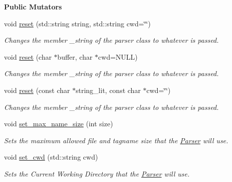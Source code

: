\begin{Indent}\textbf{ Public Mutators}\par
\begin{DoxyCompactItemize}
\item 
void \mbox{\hyperlink{class_parser_a87f5e73ca10ef5f84f37a4b37e0e6f59}{reset}} (std\+::string string, std\+::string cwd=\char`\"{}\char`\"{})
\begin{DoxyCompactList}\small\item\em Changes the member \+\_\+string of the parser class to whatever is passed. \end{DoxyCompactList}\item 
void \mbox{\hyperlink{class_parser_a5e097c301e171481e8d2af91c112e35e}{reset}} (char $\ast$buffer, char $\ast$cwd=N\+U\+LL)
\begin{DoxyCompactList}\small\item\em Changes the member \+\_\+string of the parser class to whatever is passed. \end{DoxyCompactList}\item 
void \mbox{\hyperlink{class_parser_ab51b81b1617f1948205d73804e3c0fb9}{reset}} (const char $\ast$string\+\_\+lit, const char $\ast$cwd=\char`\"{}\char`\"{})
\begin{DoxyCompactList}\small\item\em Changes the member \+\_\+string of the parser class to whatever is passed. \end{DoxyCompactList}\item 
void \mbox{\hyperlink{class_parser_ac9c3bf43a7f27f92ecf538b83c5984d6}{set\+\_\+max\+\_\+name\+\_\+size}} (int size)
\begin{DoxyCompactList}\small\item\em Sets the maximum allowed file and tagname size that the \mbox{\hyperlink{class_parser}{Parser}} will use. \end{DoxyCompactList}\item 
void \mbox{\hyperlink{class_parser_a086f1431a0cac193fb6ff4506ba5c701}{set\+\_\+cwd}} (std\+::string cwd)
\begin{DoxyCompactList}\small\item\em Sets the Current Working Directory that the \mbox{\hyperlink{class_parser}{Parser}} will use. \end{DoxyCompactList}\end{DoxyCompactItemize}
\end{Indent}
